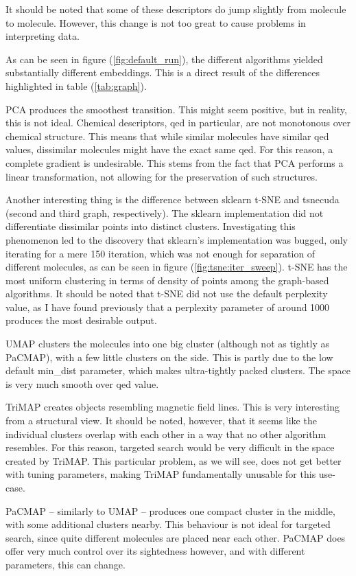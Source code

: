 It should be noted that some of these descriptors do jump slightly from molecule to molecule. However, this change is not too great to cause problems in interpreting data.

As can be seen in figure (\ref{fig:default_run}), the different algorithms yielded substantially different embeddings. This is a direct result of the differences highlighted in table (\ref{tab:graph}).

PCA produces the smoothest transition. This might seem positive, but in reality, this is not ideal. Chemical descriptors, qed in particular, are not monotonous over chemical structure. This means that while similar molecules have similar qed values, dissimilar molecules might have the exact same qed. For this reason, a complete gradient is undesirable. This stems from the fact that PCA performs a linear transformation, not allowing for the preservation of such structures.

Another interesting thing is the difference between sklearn t-SNE and tsnecuda (second and third graph, respectively). The sklearn implementation did not differentiate dissimilar points into distinct clusters. Investigating this phenomenon led to the discovery that sklearn's implementation was bugged, only iterating for a mere 150 iteration, which was not enough for separation of different molecules, as can be seen in figure (\ref{fig:tsne:iter_sweep}). t-SNE has the most uniform clustering in terms of density of points among the graph-based algorithms. It should be noted that t-SNE did not use the default perplexity value, as I have found previously that a perplexity parameter of around 1000 produces the most desirable output.

UMAP clusters the molecules into one big cluster (although not as tightly as PaCMAP), with a few little clusters on the side. This is partly due to the low default min\_dist parameter, which makes ultra-tightly packed clusters. The space is very much smooth over qed value.

TriMAP creates objects resembling magnetic field lines. This is very interesting from a structural view. It should be noted, however, that it seems like the individual clusters overlap with each other in a way that no other algorithm resembles. For this reason, targeted search would be very difficult in the space created by TriMAP. This particular problem, as we will see, does not get better with tuning parameters, making TriMAP fundamentally unusable for this use-case.

PaCMAP -- similarly to UMAP -- produces one compact cluster in the middle, with some additional clusters nearby. This behaviour is not ideal for targeted search, since quite different molecules are placed near each other. PaCMAP does offer very much control over its sightedness however, and with different parameters, this can change.


